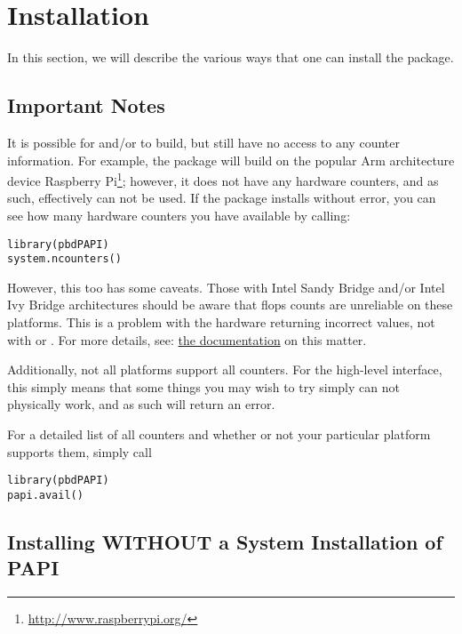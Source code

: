 \section{Installation}
\label{sec:installation}

In this section, we will describe the various ways that one can install the 
\thispackage package.


\subsection{Important Notes}

It is possible for \PAPI and/or \thispackage to build, but still have no access
to any counter information.  For example, the package will build on the popular 
Arm architecture device 
Raspberry Pi\footnote{\url{http://www.raspberrypi.org/}};
however, it does not have any hardware counters, and as such, \thispackage 
effectively can not be used.  If the package installs without error, you can 
see how many hardware counters you have available by calling:
\begin{lstlisting}[language=rr]
library(pbdPAPI)
system.ncounters()
\end{lstlisting}

However, this too has some caveats.  Those with Intel Sandy Bridge and/or Intel 
Ivy Bridge architectures should be aware that flops counts are unreliable on 
these platforms.  This is a problem with the hardware returning incorrect 
values, not with \PAPI or \thispackage.  For more details, see: 
\href{http://icl.cs.utk.edu/projects/papi/wiki/PAPITopics:SandyFlops}%
{the \PAPI documentation} on this matter.


Additionally, not all platforms support all counters.  For the high-level 
interface, this simply means that some things you may wish to try simply can 
not physically work, and as such will return an error.  

For a detailed list of all counters and whether or not your particular platform 
supports them, simply call 
\begin{lstlisting}[language=rr]
library(pbdPAPI)
papi.avail()
\end{lstlisting}





\subsection{Installing WITHOUT a System Installation of PAPI}

